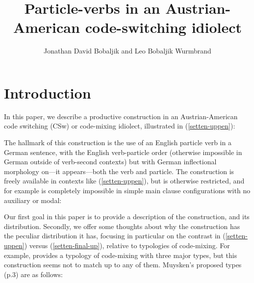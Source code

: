 \documentclass[output=paper]{langscibook}
\author{Jonathan David Bobaljik\affiliation{Harvard University} and Leo Bobaljik Wurmbrand\affiliation{Vienna, Austria}}
\title{Particle-verbs in an Austrian-American code-switching idiolect}
\begin{document}
\maketitle

\section{Introduction}
In this paper, we describe a productive construction in an Austrian-American code switching (CSw) or code-mixing idiolect, illustrated in (\ref{setten-uppen}):

\ea\label{setten-uppen}
\z
\z

The hallmark of this construction is the use of an English particle verb in a German sentence, with the English verb-particle order (otherwise impossible in German outside of verb-second contexts) but with German inflectional morphology on---it appears---both the verb and particle. The construction is freely available in contexts like (\ref{setten-uppen}), but is otherwise restricted, and for example is completely impossible in simple main clause configurations with no auxiliary or modal:

\ea\label{setten-final-up}
\z
\z 

Our first goal in this paper is to provide a description of the construction, and its distribution. Secondly, we offer some thoughts about why the construction has the peculiar distribution it has, focusing in particular on the contrast in (\ref{setten-uppen}) versus (\ref{setten-final-up}), relative to typologies of code-mixing. For example, \citet{muysken00} provides a typology of code-mixing with three major types, but this construction seems not to match up to any of them. Muysken's proposed types (p.3) are as follows: 
\end{document}
